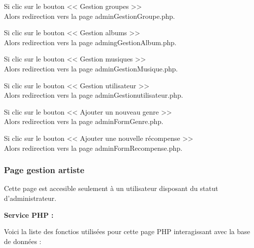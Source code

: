 			\begin{paragraphe}
				Si clic sur le bouton << Gestion groupes >> \\
				Alors redirection vers la page adminGestionGroupe.php.
			\end{paragraphe}

			\begin{paragraphe}
				Si clic sur le bouton << Gestion albums >> \\
				Alors redirection vers la page admingGestionAlbum.php.
			\end{paragraphe}

			\begin{paragraphe}
				Si clic sur le bouton << Gestion musiques >> \\
				Alors redirection vers la page adminGestionMusique.php.
			\end{paragraphe}

			\begin{paragraphe}
				Si clic sur le bouton << Gestion utilisateur >> \\
				Alors redirection vers la page adminGestionutilisateur.php.
			\end{paragraphe}

			\begin{paragraphe}
				Si clic sur le bouton << Ajouter un nouveau genre >> \\
				Alors redirection vers la page adminFormGenre.php.
			\end{paragraphe}

			\begin{paragraphe}
				Si clic sur le bouton << Ajouter une nouvelle récompense >> \\
				Alors redirection vers la page adminFormRecompense.php.
			\end{paragraphe}

		\subsubsection{Page gestion artiste}

			\begin{paragraphe}
				Cette page est accesible seulement à un utilisateur disposant du statut d'administrateur.
			\end{paragraphe}

			\begin{paragraphe}
				\textbf{Service PHP :}
			\end{paragraphe}

			\begin{paragraphe}
				Voici la liste des fonctios utilisées pour cette page PHP interagissant avec la base de données :
			\end{paragraphe}

